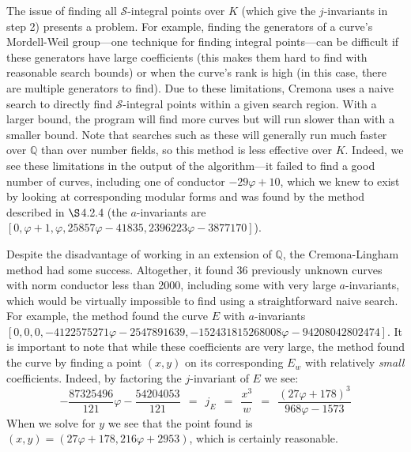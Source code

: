 The issue of finding all $\mathcal{S}$-integral points over $K$ (which give the $j$-invariants in step 2) presents a problem. For example, finding the generators of a curve's Mordell-Weil group---one technique for finding integral points---can be difficult if these generators have large coefficients (this makes them hard to find with reasonable search bounds) or when the curve's rank is high (in this case, there are multiple generators to find). Due to these limitations, Cremona uses a naive search to directly find $\mathcal{S}$-integral points within a given search region. With a larger bound, the program will find more curves but will run slower than with a smaller bound. Note that searches such as these will generally run much faster over $\mathbb{Q}$ than over number fields, so this method is less effective over $K$. Indeed, we see these limitations in the output of the algorithm---it failed to find a good number of curves, including one of conductor $-29\varphi+10$, which we knew to exist by looking at corresponding modular forms and was found by the method described in $\S$4.2.4 (the $a$-invariants are $[0, \varphi + 1, \varphi, 25857\varphi - 41835, 2396223\varphi - 3877170]$).

Despite the disadvantage of working in an extension of $\mathbb{Q}$, the Cremona-Lingham method had some success. Altogether, it found 36 previously unknown curves with norm conductor less than 2000, including some with very large $a$-invariants, which would be virtually impossible to find using a straightforward naive search. For example, the method found the curve $E$ with $a$-invariants $[0, 0, 0, -4122575271\varphi - 2547891639, -152431815268008\varphi - 94208042802474]$. It is important to note that while these coefficients are very large, the method found the curve by finding a point $(x,y)$ on its corresponding $E_w$ with relatively \emph{small} coefficients. Indeed, by factoring the $j$-invariant of $E$ we see:
\begin{equation}
-\frac{87325496}{121}\varphi - \frac{54204053}{121} \ \ = \ \ j_E \ \ = \ \ \frac{x^3}{w} \ \ = \ \ \frac{(27\varphi + 178)^3}{968\varphi - 1573} \nonumber
\end{equation}
When we solve for $y$ we see that the point found is $(x,y) = (27\varphi+178,216\varphi + 2953)$, which is certainly reasonable.